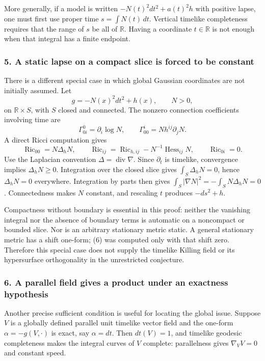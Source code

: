 \documentclass[11pt]{article}
\begin{document}
More generally, if a model is written
$-N(t)^2dt^2+a(t)^2h$ with positive lapse, one must first use proper time
$s=\int N(t)\,dt$. Vertical timelike completeness requires that the range of $s$ be all of $\mathbb R$. Having a coordinate $t\in\mathbb R$ is not enough when that integral has a finite endpoint.

\subsubsection{5. A static lapse on a compact slice is forced to be constant}
There is a different special case in which global Gaussian coordinates are not initially assumed. Let
\[
 g=-N(x)^2dt^2+h(x),\qquad N>0,
\]
on $\mathbb R\times S$, with $S$ closed and connected. The nonzero connection coefficients involving time are
\[
 \Gamma^0_{0i}=\partial_i\log N,\qquad
 \Gamma^i_{00}=N h^{ij}\partial_jN.
\]
A direct Ricci computation gives
\[
 \operatorname{Ric}_{00}=N\Delta_hN,\qquad
 \operatorname{Ric}_{ij}=\operatorname{Ric}_{h,ij}
                         -N^{-1}\operatorname{Hess}_{ij}N,
 \qquad \operatorname{Ric}_{0i}=0.                     \tag{6}
\]
Use the Laplacian convention $\Delta=\operatorname{div}\nabla$. Since $\partial_t$ is timelike, convergence implies $\Delta_hN\ge0$. Integration over the closed slice gives $\int_S\Delta_hN=0$, hence $\Delta_hN=0$ everywhere. Integration by parts then gives
$\int_S|\nabla N|^2=-\int_SN\Delta_hN=0$. Connectedness makes $N$ constant, and rescaling $t$ produces $-ds^2+h$.

Compactness without boundary is essential in this proof: neither the vanishing integral nor the absence of boundary terms is automatic on a noncompact or bounded slice. Nor is an arbitrary stationary metric static. A general stationary metric has a shift one-form; (6) was computed only with that shift zero. Therefore this special case does not supply the timelike Killing field or its hypersurface orthogonality in the unrestricted conjecture.

\subsubsection{6. A parallel field gives a product under an exactness hypothesis}
Another precise sufficient condition is useful for locating the global issue. Suppose $V$ is a globally defined parallel unit timelike vector field and the one-form
$\alpha=-g(V,\cdot)$ is exact, say $\alpha=dt$. Then $dt(V)=1$, and timelike geodesic completeness makes the integral curves of $V$ complete: parallelness gives $\nabla_VV=0$ and constant speed.
\end{document}
